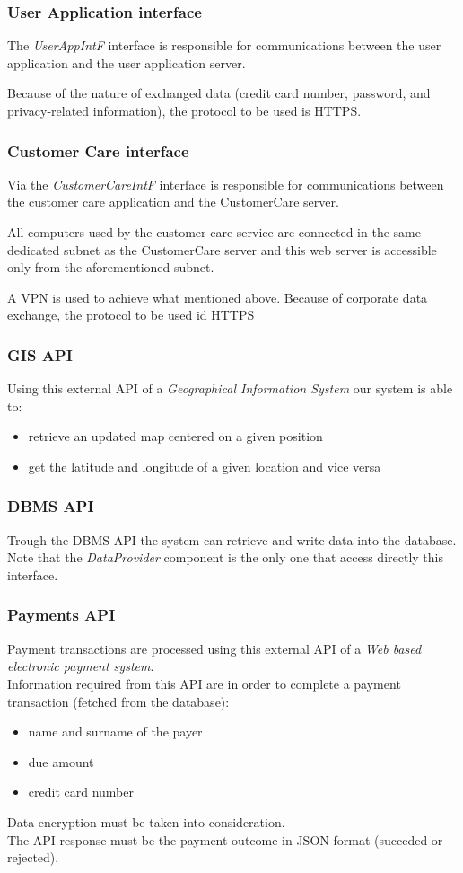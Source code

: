 \subsubsection{User Application interface}
The \emph{UserAppIntF} interface is responsible for communications between the user application and the user application server.

Because of the nature of exchanged data (credit card number, password, and privacy-related information), the protocol to be used is HTTPS.

\subsubsection{Customer Care interface}
Via the \emph{CustomerCareIntF} interface is responsible for communications between the customer care application and the CustomerCare server.

All computers used by the customer care service are connected in the same dedicated subnet as the CustomerCare server and this web server is accessible only from the aforementioned subnet. 

A VPN is used to achieve what mentioned above. Because of corporate data exchange, the protocol to be used id HTTPS

\subsubsection{GIS API}
Using this external API of a \emph{Geographical Information System} our system is able to:
\begin{itemize}
	\item retrieve an updated map centered on a given position
	\item get the latitude and longitude of a given location and vice versa
\end{itemize}

\subsubsection{DBMS API}
Trough the DBMS API the system can retrieve and write data into the database. Note that the \mbox{\emph{DataProvider}} component is the only one that access directly this interface.

\subsubsection{Payments API}
Payment transactions are processed using this external API of a \emph{Web based electronic payment system}.\\
Information required from this API are in order to complete a payment transaction (fetched from the database):
\begin{itemize}
	\item name and surname of the payer
	\item due amount
	\item credit card number
\end{itemize}
Data encryption must be taken into consideration.\\
The API response must be the payment outcome in JSON format (succeded or rejected).
